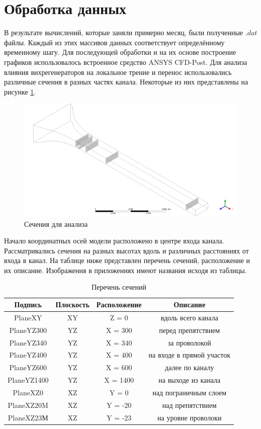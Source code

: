 \section{Обработка данных}
	В результате вычислений, которые заняли примерно месяц, были полученные $.dat$ файлы. Каждый из этих массивов данных соответствует определённому временному шагу. Для последующей обработки и на их основе построение графиков использовалось встроенное средство ANSYS CFD-Post. Для анализа влияния вихрегенераторов на локальное трение и перенос использовались различные сечения в разных частях канала. Некоторые из них представлены на рисунке \ref{fig:planesforanalysis}. 
	\begin{figure}[H]
		\centering
		\includegraphics[width=0.9\linewidth]{../Assets/1}
		\caption{Сечения для анализа}
		\label{fig:planesforanalysis}
	\end{figure}
	
	Начало координатных осей модели расположено в центре входа канала. Рассматривались сечения на разных высотах вдоль и различных расстояниях от входа в канал. На таблице ниже представлен перечень сечений, расположение и их описание. Изображения в приложениях имеют названия исходя из таблицы. %
	\begin{table}[H]
		\begin{center}
			\begin{tabular}{|c|c|c|c|}
				\hline
				Подпись & Плоскость & Расположение & Описание\\
				\hline
				PlaneXY & XY & Z = 0 & вдоль всего канала\\
				\hline
				PlaneYZ300 & YZ & X = 300 & перед препятствием\\
				\hline
				PlaneYZ340 & YZ & X = 340 & за проволокой\\
				\hline
				PlaneYZ400 & YZ & X = 400 & на входе в прямой участок\\
				\hline
				PlaneYZ600 & YZ & X = 600 & далее по каналу\\
				\hline
				PlaneYZ1400 & YZ & X = 1400 & на выходе из канала\\
				\hline
				PlaneXZ0 & XZ & Y = 0 & над пограничным слоем\\
				\hline
				PlaneXZ20M & XZ & Y = -20 & над препятствием\\
				\hline
				PlaneXZ23М & XZ & Y = -23 & на уровне проволоки\\
				\hline
			\end{tabular}
		\end{center}
		\label{tbl:sections}
		\caption{Перечень сечений}
	\end{table}
	
